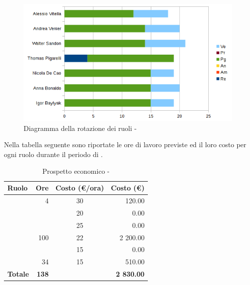 \documentclass[12pt,a4paper]{article}
\begin{document}
\begin{center}
	\begin{figure}[H]
		\centering	
        \includegraphics[width=\textwidth]{../img/diagrammaBarreProgettazioneDiDettaglioRotazioneRuoli.png}
		\caption{Diagramma della rotazione dei ruoli - \FPD{}}
	\end{figure}
\end{center}

\newpage
{}
Nella tabella seguente sono riportate le ore di lavoro previste ed il loro costo per ogni ruolo durante il periodo di \FPD{}.

\begin{table}[H]
	\begin{center}
		\begin{tabular}{l r c r}
			\toprule
			\textbf{Ruolo}	& \textbf{Ore} & \textbf{Costo (\euro/ora)}	& \textbf{Costo (\euro)} \\ \midrule
			\midrule
			\RE{} & 4 & 30 & 120.00 \\ \midrule
			\AM{} & & 20 & 0.00 \\ \midrule
			\AN{} & & 25 & 0.00 \\ \midrule
			\PG{} & 100 & 22 & 2 200.00 \\ \midrule
			\PR{} & & 15 & 0.00 \\ \midrule
			\VR{} & 34 & 15 & 510.00 \\ \midrule
			\textbf{Totale} & \textbf{138} &  & \textbf{2 830.00} \\
			\bottomrule
		\end{tabular}
		\caption{Prospetto economico - \FPD{}}
	\end{center}
\end{table}
\end{document}
